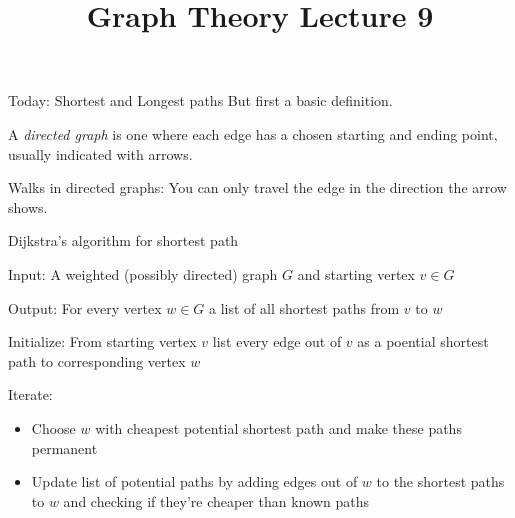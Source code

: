 \documentclass{beamer}
\title{Graph Theory Lecture 9}
\begin{document}
\begin{frame}{Today: Shortest and Longest paths}
  But first a basic definition.
  \begin{definition} A \emph{directed graph} is one where each edge has a chosen starting and ending point, usually indicated with arrows.
 \end{definition}
\begin{center}
\end{center}


  
  \begin{block}{Walks in directed graphs:}
You can only travel the edge in the direction the arrow shows.
    \end{block}
\end{frame}

\begin{frame}{Dijkstra's algorithm for shortest path}
  \begin{block}{Input:} A weighted (possibly directed) graph $G$ and starting vertex $v\in G$
  \end{block}
  \begin{block}{Output:} For every vertex $w\in G$ a list of all shortest paths from $v$ to $w$
  \end{block}
  
 \begin{block}{Initialize:}
   From starting vertex $v$ list every edge out of $v$ as a poential shortest path to corresponding vertex $w$
   \end{block}
       \begin{block}{Iterate:}
 \begin{itemize}
 \item Choose $w$ with cheapest potential shortest path and make these paths permanent


 \item Update list of potential paths by adding edges out of $w$ to the shortest paths to $w$ and checking if they're cheaper than known paths
   \end{itemize}
 \end{block}
  \end{frame}
\end{document}

